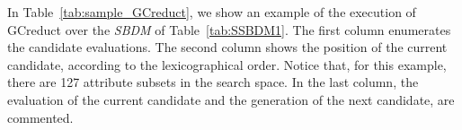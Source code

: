 \documentclass[number,preprint,review,12pt]{elsarticle}
\begin{document}
	In Table~\ref{tab:sample_GCreduct}, we show an example of the execution of GCreduct over the \textit{SBDM} of Table~\ref{tab:SSBDM1}. The first column enumerates the candidate evaluations. The second column shows the position of the current candidate, according to the lexicographical order. Notice that, for this example, there are 127 attribute subsets in the search space. In the last column, the evaluation of the current candidate and the generation of the next candidate, are commented.
\end{document}
